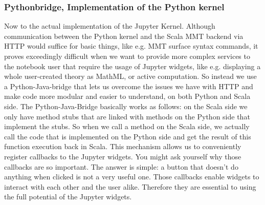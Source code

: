 \subsubsection{Pythonbridge, Implementation of the Python kernel}
Now to the actual implementation of the Jupyter Kernel. Although communication between 
the Python kernel and the Scala MMT backend via HTTP would suffice for basic things,
like e.g. MMT surface syntax commands, it proves exceedingly difficult when we want to 
provide more complex services to the notebook user that require the usage of Jupyter widgets,
like e.g. displaying a whole user-created theory as MathML, or active computation. 
So instead we use a Python-Java-bridge that lets us overcome the issues we have with HTTP and
make code more modular and easier to understand, on both Python and Scala side.
The Python-Java-Bridge basically works as follows: on the Scala side we only have method stubs
that are linked with methods on the Python side that implement the stubs. So when we call 
a method on the Scala side, we actually call the code that is implemented on the Python side 
and get the result of this function execution back in Scala. This mechanism allows us to 
conveniently register callbacks to the Jupyter widgets. You might ask yourself why those callbacks 
are so important. The answer is simple: a button that doesn't do anything when clicked is not 
a very useful one. Those callbacks enable widgets to interact with each other and the user alike. 
Therefore they are essential to using the full potential of the Jupyter widgets.




